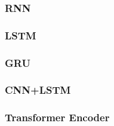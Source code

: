 \subsubsection{RNN}

\subsubsection{LSTM}

\subsubsection{GRU}

\subsubsection{CNN+LSTM}

\subsubsection{Transformer Encoder}
